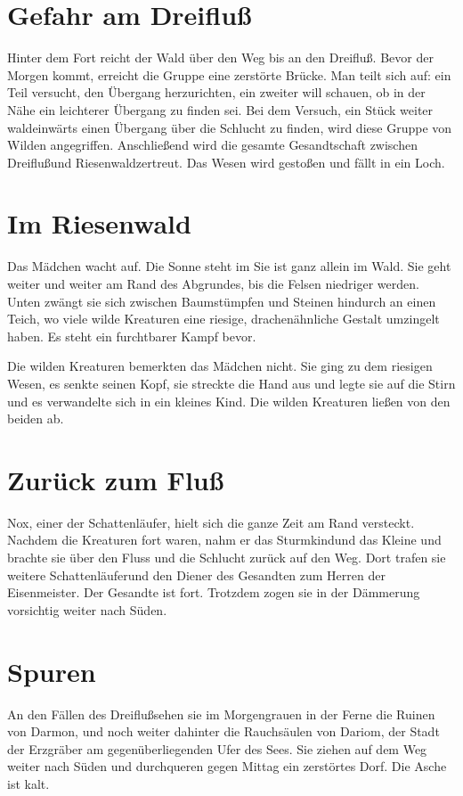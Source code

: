 \documentclass[12pt,a4paper,onecolumn,twoside,ngerman]{book}
\newcommand{\Sturmkind}{Sturmkind}
\newcommand{\Schattenlaufer}{Schattenläufer}
\newcommand{\Nox}{Nox}
\newcommand{\Dreifluss}{Dreifluß}
\newcommand{\Darmon}{Darmon}
\newcommand{\Riesenwald}{Riesenwald}
\newcommand{\Eisenmeister}{Eisenmeister}
\newcommand{\Dariom}{Dariom}
\begin{document}
\section{Gefahr am \Dreifluss}
Hinter dem Fort reicht der Wald über den Weg bis an den \Dreifluss. Bevor der Morgen kommt, erreicht die Gruppe eine zerstörte Brücke. Man teilt sich auf: ein Teil versucht, den Übergang herzurichten, ein zweiter will schauen, ob in der Nähe ein leichterer Übergang zu finden sei. Bei dem Versuch, ein Stück weiter waldeinwärts einen Übergang über die Schlucht zu finden, wird diese Gruppe von Wilden angegriffen. Anschließend wird die gesamte Gesandtschaft zwischen \Dreifluss und \Riesenwald zertreut. Das Wesen wird gestoßen und fällt in ein Loch.

\section{Im \Riesenwald}
Das Mädchen wacht auf. Die Sonne steht im Sie ist ganz allein im Wald. Sie geht weiter und weiter am Rand des Abgrundes, bis die Felsen niedriger werden. Unten zwängt sie sich zwischen Baumstümpfen und Steinen hindurch an einen Teich, wo viele wilde Kreaturen eine riesige, drachenähnliche Gestalt umzingelt haben. Es steht ein furchtbarer Kampf bevor.

Die wilden Kreaturen bemerkten das Mädchen nicht. Sie ging zu dem riesigen Wesen, es senkte seinen Kopf, sie streckte die Hand aus und legte sie auf die Stirn und es verwandelte sich in ein kleines Kind. Die wilden Kreaturen ließen von den beiden ab.

\section{Zurück zum Fluß}
\Nox, einer der \Schattenlaufer, hielt sich die ganze Zeit am Rand versteckt. Nachdem die Kreaturen fort waren, nahm er das \Sturmkind und das Kleine und brachte sie über den Fluss und die Schlucht zurück auf den Weg. Dort trafen sie weitere \Schattenlaufer und den Diener des Gesandten zum Herren der \Eisenmeister. Der Gesandte ist fort. Trotzdem zogen sie in der Dämmerung vorsichtig weiter nach Süden.

\section{Spuren}
An den Fällen des \Dreifluss sehen sie im Morgengrauen in der Ferne die Ruinen von \Darmon, und noch weiter dahinter die Rauchsäulen von \Dariom, der Stadt der Erzgräber am gegenüberliegenden Ufer des Sees. Sie ziehen auf dem Weg weiter nach Süden und durchqueren gegen Mittag ein zerstörtes Dorf. Die Asche ist kalt.
\end{document}
